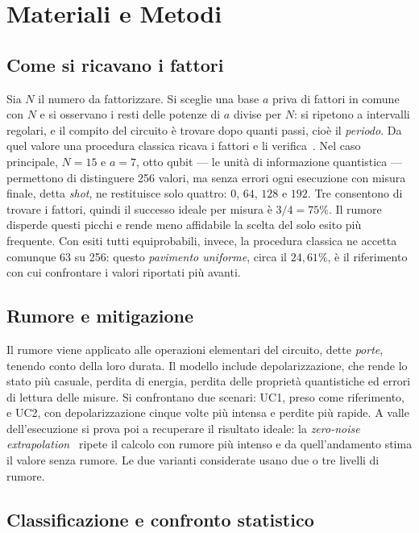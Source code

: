 \section*{Materiali e Metodi}

\subsection*{Come si ricavano i fattori}

Sia $N$ il numero da fattorizzare.
Si sceglie una base $a$ priva di fattori in comune con $N$ e si osservano i resti
delle potenze di $a$ divise per $N$: si ripetono a intervalli regolari, e il
compito del circuito è trovare dopo quanti passi, cioè il \emph{periodo}.
Da quel valore una procedura classica ricava i fattori e li
verifica~\cite{nielsenChuang2000}.
Nel caso principale, $N=15$ e $a=7$, otto qubit --- le unità di informazione
quantistica --- permettono di distinguere 256 valori, ma senza errori ogni
esecuzione con misura finale, detta \emph{shot}, ne restituisce solo quattro:
$0$, $64$, $128$ e $192$.
Tre consentono di trovare i fattori, quindi il successo ideale per misura è
$3/4=75\%$.
Il rumore disperde questi picchi e rende meno affidabile la scelta del solo esito
più frequente.
Con esiti tutti equiprobabili, invece, la procedura classica ne accetta comunque
63 su 256: questo \emph{pavimento uniforme}, circa il $24{,}61\%$, è il
riferimento con cui confrontare i valori riportati più avanti.

\subsection*{Rumore e mitigazione}

Il rumore viene applicato alle operazioni elementari del circuito, dette
\emph{porte}, tenendo conto della loro durata.
Il modello include depolarizzazione, che rende lo stato più casuale, perdita di
energia, perdita delle proprietà quantistiche ed errori di lettura delle misure.
Si confrontano due scenari: UC1, preso come riferimento, e UC2, con
depolarizzazione cinque volte più intensa e perdite più rapide.
A valle dell'esecuzione si prova poi a recuperare il risultato ideale: la
\emph{zero-noise extrapolation}~\cite{temme2017} ripete il calcolo con rumore più
intenso e da quell'andamento stima il valore senza rumore.
Le due varianti considerate usano due o tre livelli di rumore.

\subsection*{Classificazione e confronto statistico}

